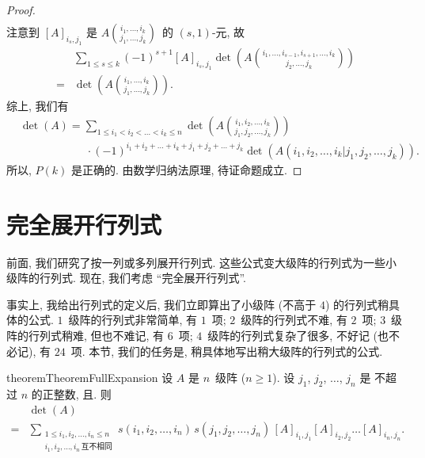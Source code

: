 \documentclass[%
    UTF8,%
    fontset=none,%
    punct=kaiming,%
    zihao=-4,%
    a4paper,%
    oneside,%
]{ctexbook}
\let\emph\relax
\renewcommand*{\leq}{\leqslant}
\renewcommand*{\geq}{\geqslant}
\begin{document}
\begin{proof}
\begin{align*}
    \end{align*}
    注意到 \([A]_{i_s,j_1}\) 是
    \(\displaystyle
    A\binom{i_1, \dots, i_k}
    {j_1, \dots, j_k}\)~的
    \((s, 1)\)-元, 故
    \begin{align*}
             & \sum_{1 \leq s \leq k}
        {(-1)^{s+1} [A]_{i_s,j_1}
            \det {\left(
                A\binom{i_1, \dots, i_{s-1}, i_{s+1}, \dots, i_k}
                {j_2, \dots, j_k}
                \right)}}
        \\
        = {} & \det {\left(
            A\binom{i_1, \dots, i_k}
            {j_1, \dots, j_k}
            \right)}.
    \end{align*}
    综上, 我们有
    \begin{align*}
         &
        \det {(A)}
        = \sum_{1 \leq i_1 < i_2 < \dots < i_k \leq n}
        {\det {\left(
                A\binom{i_1, i_2, \dots, i_k}
                {j_1, j_2, \dots, j_k}
                \right)}}
        \\
         &
        \qquad \qquad \qquad
        \cdot (-1)^{i_1 + i_2 + \dots + i_k
            + j_1 + j_2 + \dots + j_k}
        \det {(A({i_1,i_2,\dots,i_k}|{j_1,j_2,\dots,j_k}))}.
    \end{align*}
    所以, \(P(k)\) 是正确的.
    由数学归纳法原理, 待证命题成立.
\end{proof}

\section{完全展开行列式}

\OptionalReading

前面, 我们研究了按一列或多列展开行列式.
这些公式变大级阵的行列式为一些小级阵的行列式.
现在, 我们考虑 ``完全展开行列式''.

事实上, 我给出行列式的定义后,
我们立即算出了小级阵 (不高于 \(4\))
的行列式稍具体的公式.
\(1\)~级阵的行列式非常简单, 有 \(1\)~项;
\(2\)~级阵的行列式不难, 有 \(2\)~项;
\(3\)~级阵的行列式稍难, 但也不难记, 有 \(6\)~项;
\(4\)~级阵的行列式复杂了很多, 不好记 (也不必记),
有 \(24\)~项.
本节, 我们的任务是,
稍具体地写出稍大级阵的行列式的公式.

\begin{restatable}[]{theorem}{TheoremFullExpansion}
    设 \(A\) 是 \(n\)~级阵 (\(n \geq 1\)).
    设 \(j_1\), \(j_2\), \(\dots\), \(j_n\) 是%
    不超过 \(n\) 的正整数,
    且\emph{互不相同}.
    则
    \begin{align*}
             & \det {(A)}
        \\
        = {} &
        \sum_{\substack{
        1 \leq i_1, i_2, \dots, i_n \leq n \\
                i_1, i_2, \dots, i_n\,\text{互不相同}
            }}
        {s(i_1, i_2, \dots, i_n)\,
            s(j_1, j_2, \dots, j_n)\,
            [A]_{i_1,j_1} [A]_{i_2,j_2} \dots [A]_{i_n,j_n}}.
    \end{align*}
\end{restatable}
\end{document}
